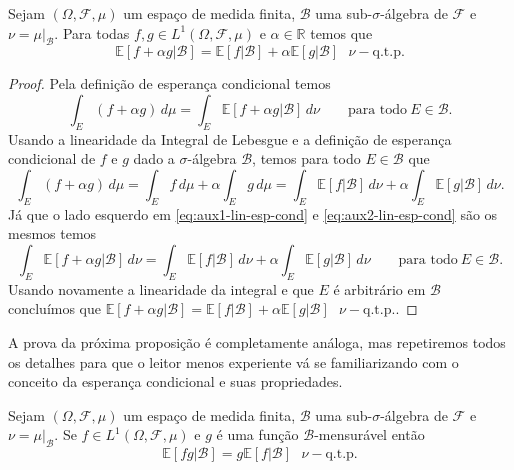 \begin{proposicao}
	\label{teo:linearidade-esperanca-condicional}
Sejam $(\Omega,\mathcal{F},\mu)$ um espaço de medida finita, 
$\mathcal{B}$ uma sub-$\sigma$-álgebra 
de $\mathcal{F}$ e $\nu=\mu|_{\mathcal{B}}$. 
Para todas $f,g\in L^1(\Omega,\mathcal{F},\mu)$ 
e $\alpha\in\mathbb{R}$ temos que 
\[
\mathbb{E}[f+\alpha g|\mathcal{B}]
=
\mathbb{E}[f|\mathcal{B}]
+
\alpha\mathbb{E}[g|\mathcal{B}] \ \ \ \nu-\text{q.t.p.}
\]
\end{proposicao}

\begin{proof}
Pela definição de esperança condicional temos 
\begin{equation}\label{eq:aux1-lin-esp-cond}
\int_{E} (f+\alpha g)\, d\mu
=
\int_{E} \mathbb{E}[f+\alpha g|\mathcal{B}]\, d\nu 
\qquad \text{para todo} \ E\in\mathcal{B}.
\end{equation}
Usando a linearidade da Integral de Lebesgue e a 
definição de esperança condicional de 
$f$ e $g$ dado a $\sigma$-álgebra
$\mathcal{B}$, temos
para todo $E\in\mathcal{B}$ que 
\begin{equation}
\label{eq:aux2-lin-esp-cond}
\int_{E} (f+\alpha g)\, d\mu
=
\int_{E} f\, d\mu+\alpha\int_{E} g\, d\mu
=
\int_{E} \mathbb{E}[f|\mathcal{B}]\, d\nu 
+
\alpha\int_{E} \mathbb{E}[g|\mathcal{B}]\, d\nu.
\end{equation}
Já que o lado esquerdo em \eqref{eq:aux1-lin-esp-cond} 
e \eqref{eq:aux2-lin-esp-cond} são os mesmos temos  
\[
\int_{E} \mathbb{E}[f+\alpha g|\mathcal{B}]\, d\nu
=
\int_{E} \mathbb{E}[f|\mathcal{B}]\, d\nu 
+
\alpha\int_{E} \mathbb{E}[g|\mathcal{B}]\, d\nu
\qquad \text{para todo} \ E\in\mathcal{B}.
\]
Usando novamente a linearidade da integral e que 
$E$ é arbitrário em $\mathcal{B}$ concluímos que
$
\mathbb{E}[f+\alpha g|\mathcal{B}]
=
\mathbb{E}[f|\mathcal{B}]
+
\alpha\mathbb{E}[g|\mathcal{B}] \ \ \ \nu-\text{q.t.p.}$.
\end{proof}

A prova da próxima proposição é completamente análoga, 
mas repetiremos todos os detalhes 
para que o leitor menos experiente vá se 
familiarizando com o conceito da esperança 
condicional e suas propriedades.


\begin{proposicao}
\label{teo:propriedades-esperanca-condicional}
Sejam $(\Omega,\mathcal{F},\mu)$ um espaço 
de medida finita, $\mathcal{B}$ uma sub-$\sigma$-álgebra 
de $\mathcal{F}$ e $\nu=\mu|_{\mathcal{B}}$. 
Se $f\in L^1(\Omega,\mathcal{F},\mu)$ e $g$ 
é uma função $\mathcal{B}$-mensurável então 
\[
\mathbb{E}[f g|\mathcal{B}]
=
g\mathbb{E}[f|\mathcal{B}] \ \ \ \nu-\text{q.t.p.}
\]
\end{proposicao}



